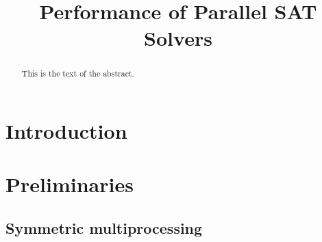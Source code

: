 \documentclass{article}
\begin{document}


 \newcommand{\assign}{$\,$:=$\;$}
\newcommand{\barc}{Barelogic$^S$}
\newcommand{\pling}{{\tt plingeling}}

\title{Performance of Parallel SAT Solvers}




\maketitle
\begin{abstract}
This is the text of the abstract.
\end{abstract}

\tableofcontents

\section{Introduction}



\section{Preliminaries}
\label{sec:preliminaries}



\subsection{Symmetric multiprocessing}
\label{sec:march}
\end{document}
